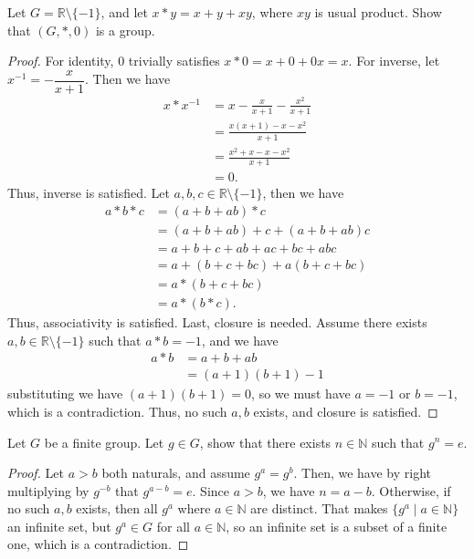 \documentclass[12pt]{article}
\begin{document}
\begin{question}
    Let $G = \mathbb{R} \setminus \{-1\}$, 
    and let $x * y = x + y + xy$, where $xy$ is usual product.
    Show that $(G,*,0)$ is a group.
\end{question}
\begin{proof}
    For identity, $0$ trivially satisfies $x * 0 = x + 0 + 0x = x$.
    For inverse, let $x^{-1} = -\dfrac{x}{x+1}$. Then we have
    \begin{align*}
        x * x^{-1} &= x - \frac{x}{x + 1} - \frac{x^{2}}{x + 1} \\
                       &= \frac{x(x+1) - x - x^{2}}{x+1} \\
                       &= \frac{x^{2} + x - x - x^{2}}{x + 1}\\
                       &= 0.
    \end{align*}
    Thus, inverse is satisfied. Let $a,b,c \in \mathbb{R} \setminus \{-1\}$, then we have
    \begin{align*}
        a * b * c &= (a + b + ab) * c\\
                  &= (a + b + ab) + c + (a + b + ab)c\\
                  &= a + b + c + ab + ac + bc + abc\\
                  &= a + (b + c + bc) + a(b + c + bc)\\
                  &= a * (b + c + bc)\\
                  &= a * (b * c).
    \end{align*}
    Thus, associativity is satisfied. Last, closure is needed.
    Assume there exists $a,b \in \mathbb{R} \setminus \{-1\}$ such that $a*b = -1$, and we have
    \begin{align*}
        a*b &= a + b + ab\\
            &= (a + 1)(b + 1) - 1
    \end{align*}
    substituting we have $(a + 1)(b + 1) = 0$,
    so we must have $a = -1$ or $b = -1$, which is a contradiction.
    Thus, no such $a,b$ exists, and closure is satisfied.
\end{proof}

\begin{question}
    Let $G$ be a finite group.
    Let $g \in G$, show that there exists $n \in \mathbb{N}$ such that $g^{n} = e$.
\end{question}
\begin{proof}
    Let $a > b$ both naturals, and assume $g^{a} = g^{b}$.
    Then, we have by right multiplying by $g^{-b}$ that $g^{a - b} = e$.
    Since $a > b$, we have $n = a - b$.
    Otherwise, if no such $a,b$ exists, then all $g^{a}$ where $a \in \mathbb{N}$
    are distinct. 
    That makes $\{g^{a} \mid a \in \mathbb{N}\}$ an infinite set,
    but $g^{a} \in G$ for all $a \in \mathbb{N}$, 
    so an infinite set is a subset of a finite one, which is a contradiction.
\end{proof}
\end{document}
